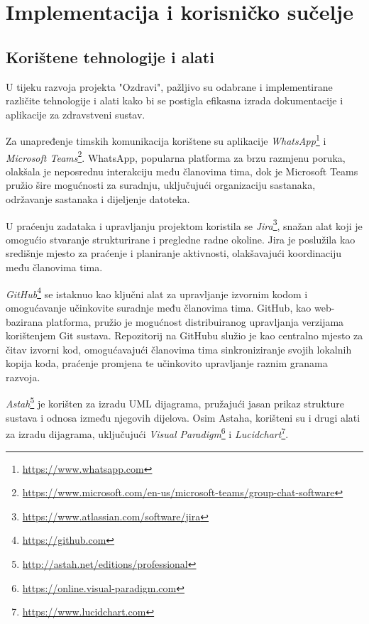 \chapter{Implementacija i korisničko sučelje}
		\section{Korištene tehnologije i alati}
		
			
			 U tijeku razvoja projekta "Ozdravi", pažljivo su odabrane i implementirane različite tehnologije i alati kako bi se postigla efikasna izrada dokumentacije i aplikacije za zdravstveni sustav.

			 Za unapređenje timskih komunikacija korištene su aplikacije \textit{WhatsApp}\footnote{\url{https://www.whatsapp.com}} i \textit{Microsoft Teams}\footnote{\url{https://www.microsoft.com/en-us/microsoft-teams/group-chat-software}}. WhatsApp, popularna platforma za brzu razmjenu poruka, olakšala je neposrednu interakciju među članovima tima, dok je Microsoft Teams pružio šire mogućnosti za suradnju, uključujući organizaciju sastanaka, održavanje sastanaka i dijeljenje datoteka.
			 
			 U praćenju zadataka i upravljanju projektom koristila se \textit{Jira}\footnote{\url{https://www.atlassian.com/software/jira}}, snažan alat koji je omogućio stvaranje strukturirane i pregledne radne okoline. Jira je poslužila kao središnje mjesto za praćenje i planiranje aktivnosti, olakšavajući koordinaciju među članovima tima.

			 \textit{GitHub}\footnote{\url{https://github.com}} se istaknuo kao ključni alat za upravljanje izvornim kodom i omogućavanje učinkovite suradnje među članovima tima. GitHub, kao web-bazirana platforma, pružio je mogućnost distribuiranog upravljanja verzijama korištenjem Git sustava. Repozitorij na GitHubu služio je kao centralno mjesto za čitav izvorni kod, omogućavajući članovima tima sinkroniziranje svojih lokalnih kopija koda, praćenje promjena te učinkovito upravljanje raznim granama razvoja.

			 \textit{Astah}\footnote{\url{http://astah.net/editions/professional}} je korišten za izradu UML dijagrama, pružajući jasan prikaz strukture sustava i odnosa između njegovih dijelova. Osim Astaha, korišteni su i drugi alati za izradu dijagrama, uključujući \textit{Visual Paradigm}\footnote{\url{https://online.visual-paradigm.com}} i \textit{Lucidchart}\footnote{\url{https://www.lucidchart.com}}.
			 
